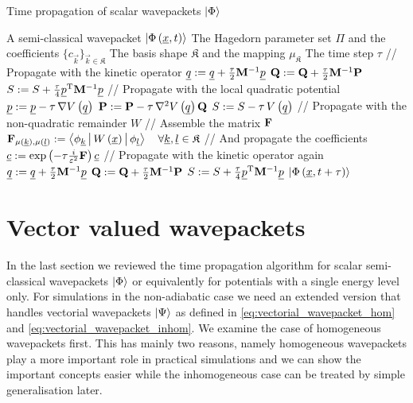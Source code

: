 \begin{algorithm}
\caption{Time propagation of scalar wavepackets $\Ket{\Phi}$}
\label{al:tp_wave_packets_scalar}
\begin{algorithmic}
  \REQUIRE A semi-classical wavepacket $\Ket{\Phi\left( \underline{x},t \right)}$
  \REQUIRE The Hagedorn parameter set $\Pi$ and the coefficients $\{c_{\vec{k}}\}_{\vec{k}\in\mathfrak{K}}$
  \REQUIRE The basis shape $\mathfrak{K}$ and the mapping $\mu_{\mathfrak{K}}$
  \REQUIRE The time step $\tau$
  \STATE // Propagate with the kinetic operator
  \STATE $\underline{q} := \underline{q} + \frac{\tau}{2} \mathbf{M}{}^{-1} \underline{p}$
  \STATE $\mathbf{Q} := \mathbf{Q} + \frac{\tau}{2} \mathbf{M}{}^{-1} \mathbf{P}$
  \STATE $S := S + \frac{\tau}{4} \underline{p}{}^{\textnormal{T}} \mathbf{M}{}^{-1} \underline{p}$
  \STATE // Propagate with the local quadratic potential
  \STATE $\underline{p} := \underline{p} - \tau \, \nabla V\left( \underline{q} \right)$
  \STATE $\mathbf{P} := \mathbf{P} - \tau \, \nabla^2 V\left( \underline{q} \right) \mathbf{Q}$
  \STATE $S := S - \tau \, V\left( \underline{q} \right)$
  \STATE // Propagate with the non-quadratic remainder $W$
  \STATE // Assemble the matrix $\mathbf{F}$
  \STATE $\mathbf{F}_{\mu(\underline{k}),\mu(\underline{l})} :=
          \Braket{\phi_{\underline{k}} | W\left( \underline{x} \right) | \phi_{\underline{l}}} \quad \forall \underline{k}, \underline{l} \in \mathfrak{K}$
  \STATE // And propagate the coefficients
  \STATE $\underline{c} := \exp\left( -\tau \frac{i}{\varepsilon^2} \mathbf{F} \right) \underline{c}$
  \STATE // Propagate with the kinetic operator again
  \STATE $\underline{q} := \underline{q} + \frac{\tau}{2} \mathbf{M}{}^{-1} \underline{p}$
  \STATE $\mathbf{Q} := \mathbf{Q} + \frac{\tau}{2} \mathbf{M}{}^{-1} \mathbf{P}$
  \STATE $S := S + \frac{\tau}{4} \underline{p}{}^{\textnormal{T}} \mathbf{M}{}^{-1} \underline{p}$
  \RETURN $\Ket{\Phi\left( \underline{x},t+\tau \right)}$
\end{algorithmic}
\end{algorithm}


\section{Vector valued wavepackets}


In the last section we reviewed the time propagation algorithm for scalar semi-classical
wavepackets $\Ket{\Phi}$ or equivalently for potentials with a single energy level only.
For simulations in the non-adiabatic case we need an extended version that handles
vectorial wavepackets $\Ket{\Psi}$ as defined in \eqref{eq:vectorial_wavepacket_hom}
and \eqref{eq:vectorial_wavepacket_inhom}. We examine the case of homogeneous
wavepackets first. This has mainly two reasons, namely homogeneous wavepackets
play a more important role in practical simulations and we can show the important
concepts easier while the inhomogeneous case can be treated by simple generalisation
later.


